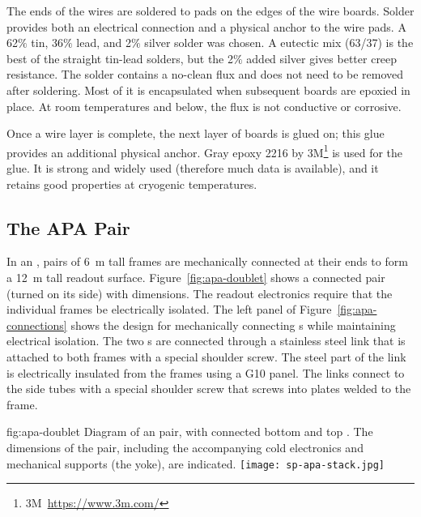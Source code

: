 The ends of the wires are soldered to pads on the edges of the wire boards.  Solder provides both an electrical connection and a physical anchor to the wire pads. A 62$\%$ tin, 36$\%$ lead, and 2$\%$ silver solder was chosen.  A eutectic mix (63/37) is the best of the straight tin-lead solders, but the 2$\%$ added silver gives better creep resistance.  The solder contains a no-clean flux and does not need to be removed after soldering. Most of it is encapsulated when subsequent boards are epoxied in place.  At room temperatures and below, the flux is not conductive or corrosive.

Once a wire layer is complete, the next layer of boards is glued on; this glue provides an additional physical anchor. Gray epoxy \num{2216} by 3M\footnote{3M\texttrademark ~\url{https://www.3m.com/}} is used for the glue.  It is strong and widely used (therefore much data is available), and it retains good properties at cryogenic temperatures.  



\subsection{The APA Pair} %
\label{sec:fdsp-apa-intfc-apa}


In an , pairs of \SI{6}{m} tall  frames are mechanically connected at their ends to form a \SI{12}{m} tall readout surface.  Figure~\ref{fig:apa-doublet} shows a connected pair (turned on its side) with dimensions.  The  readout electronics require that the individual  frames be electrically isolated.   The left panel of Figure~\ref{fig:apa-connections} shows the design for mechanically connecting s while maintaining electrical isolation.  The two s are connected through a stainless steel link that is attached to both frames with a special shoulder screw.  The steel part of the link is electrically insulated from the frames using a G10 panel.  The links connect to the side tubes with a special shoulder screw that screws into plates welded to the frame.  

\begin{dunefigure}{fig:apa-doublet}
{Diagram of an  pair, with connected bottom and top . The dimensions of the  pair, including the accompanying cold electronics and mechanical supports (the yoke), are indicated.}
\texttt{[image: sp-apa-stack.jpg]} 
\end{dunefigure}

